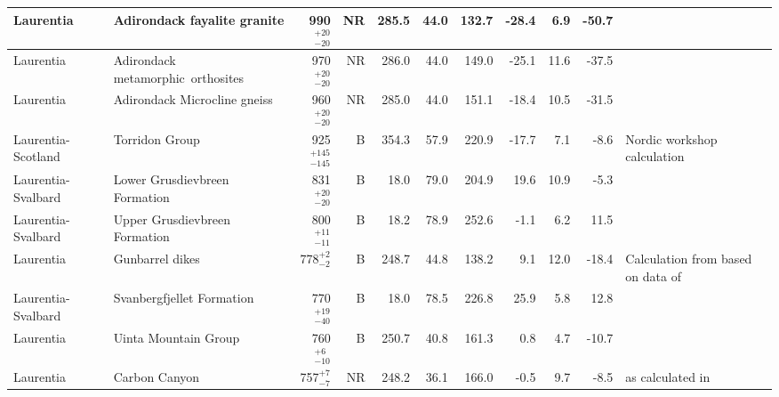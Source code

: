 \documentclass[twocolumn, switch]{article} %
\begin{document}
{\begin{landscape}
\begin{ThreePartTable}
\begin{longtable}{p{1.4 in}p{1.2 in}rrrrrrrrp{1.2 in}}
                     Laurentia &                        Adirondack fayalite granite &    990$^{+20}_{-20}$ &     NR &     285.5 &      44.0 & 132.7 & -28.4 &       6.9 &       -50.7 &                                  \cite{Brown2012a} \\ \hline
                     Laurentia &               Adirondack metamorphic\ orthosites &    970$^{+20}_{-20}$ &     NR &     286.0 &      44.0 & 149.0 & -25.1 &      11.6 &       -37.5 &                                  \cite{Brown2012a} \\ \hline
                     Laurentia &                       Adirondack Microcline gneiss &    960$^{+20}_{-20}$ &     NR &     285.0 &      44.0 & 151.1 & -18.4 &      10.5 &       -31.5 &                                  \cite{Brown2012a} \\ \hline
            Laurentia-Scotland &                                     Torridon Group &  925$^{+145}_{-145}$ &      B &     354.3 &      57.9 & 220.9 & -17.7 &       7.1 &        -8.6 &                        Nordic workshop calculation \\ \hline
            Laurentia-Svalbard &                      Lower Grusdievbreen Formation &    831$^{+20}_{-20}$ &      B &      18.0 &      79.0 & 204.9 &  19.6 &      10.9 &        -5.3 &                                 \cite{Maloof2006a} \\ \hline
            Laurentia-Svalbard &                      Upper Grusdievbreen Formation &    800$^{+11}_{-11}$ &      B &      18.2 &      78.9 & 252.6 &  -1.1 &       6.2 &        11.5 &                                 \cite{Maloof2006a} \\ \hline
                     Laurentia &                                    Gunbarrel dikes &      778$^{+2}_{-2}$ &      B &     248.7 &      44.8 & 138.2 &   9.1 &      12.0 &       -18.4 &  Calculation from \cite{Eyster2020a} based on data of \cite{Harlan1993a, Harlan1997a} \\ \hline
            Laurentia-Svalbard &                          Svanbergfjellet Formation &    770$^{+19}_{-40}$ &      B &      18.0 &      78.5 & 226.8 &  25.9 &       5.8 &        12.8 &                                 \cite{Maloof2006a} \\ \hline
                     Laurentia &                               Uinta Mountain Group &     760$^{+6}_{-10}$ &      B &     250.7 &      40.8 & 161.3 &   0.8 &       4.7 &       -10.7 &                                   \cite{Weil2006b} \\ \hline
                     Laurentia &                                      Carbon Canyon &      757$^{+7}_{-7}$ &     NR &     248.2 &      36.1 & 166.0 &  -0.5 &       9.7 &        -8.5 &  \cite{Weil2004a} as calculated in \cite{Eyster2020a} \\ \hline

\end{longtable}
\end{ThreePartTable}
\end{landscape}}
\end{document}
